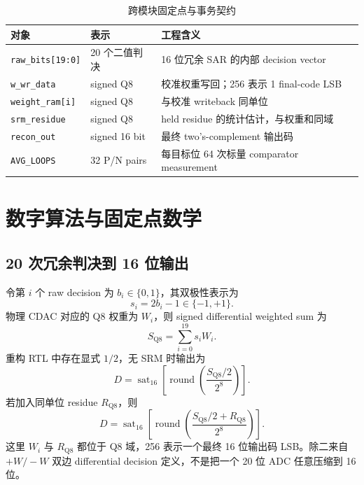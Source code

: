 \documentclass[UTF8,fontset=none,a4paper,11pt,openany]{ctexrep}
\begin{document}
\begin{table}[H]
\centering
\caption{跨模块固定点与事务契约}
\label{tab:interface-contract}
\begin{tabularx}{\textwidth}{p{}p{}X}
\toprule
对象 & 表示 & 工程含义\\
\midrule
\texttt{raw\_bits[19:0]} & 20 个二值判决 & 16 位冗余 SAR 的内部 decision vector\\
\texttt{w\_wr\_data} & signed Q8 & 校准权重写回；256 表示 1 final-code LSB\\
\texttt{weight\_ram[i]} & signed Q8 & 与校准 writeback 同单位\\
\texttt{srm\_residue} & signed Q8 & held residue 的统计估计，与权重和同域\\
\texttt{recon\_out} & signed 16 bit & 最终 two's-complement 输出码\\
\texttt{AVG\_LOOPS} & 32 P/N pairs & 每目标位 64 次标量 comparator measurement\\
\bottomrule
\end{tabularx}
\end{table}

\chapter{数字算法与固定点数学}

\section{20 次冗余判决到 16 位输出}

令第 $i$ 个 raw decision 为 $b_i\in\{0,1\}$，其双极性表示为
\begin{equation}
s_i = 2b_i-1\in\{-1,+1\}.
\end{equation}
物理 CDAC 对应的 Q8 权重为 $W_i$，则 signed differential weighted sum 为
\begin{equation}
S_{\mathrm{Q8}}=\sum_{i=0}^{19}s_iW_i.
\end{equation}
重构 RTL 中存在显式 $1/2$，无 SRM 时输出为
\begin{equation}
D=\operatorname{sat}_{16}\!\left[
\operatorname{round}\!\left(\frac{S_{\mathrm{Q8}}/2}{2^8}\right)
\right].
\label{eq:recon-no-srm}
\end{equation}
若加入同单位 residue $R_{\mathrm{Q8}}$，则
\begin{equation}
D=\operatorname{sat}_{16}\!\left[
\operatorname{round}\!\left(\frac{S_{\mathrm{Q8}}/2+R_{\mathrm{Q8}}}{2^8}\right)
\right].
\label{eq:recon-srm}
\end{equation}
这里 $W_i$ 与 $R_{\mathrm{Q8}}$ 都位于 Q8 域，256 表示一个最终 16 位输出码 LSB。除二来自 $+W/-W$ 双边 differential decision 定义，不是把一个 20 位 ADC 任意压缩到 16 位。
\end{document}
